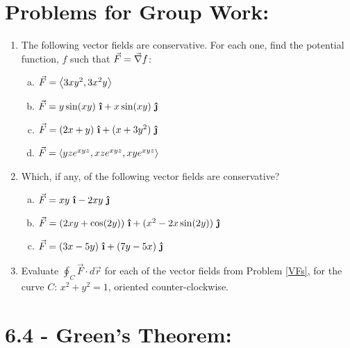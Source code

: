 

\section*{Problems for Group Work:}


\begin{enumerate}[{Problem} 1: ]
\item The following vector fields are conservative. For each one, find the potential function, \(f\) such that \(\vec{F} = \vec{\nabla} f\):
\begin{enumerate}[a)]
\item \(\vec{F} = \left\langle3xy^2, 3x^2y\right\rangle\)
\item \(\vec{F} = y\sin(xy)\ \ihat +x\sin(xy)\ \jhat\)
\item \(\vec{F} = (2x+y)\ \ihat +(x+3y^2)\ \jhat\)
\item \(\vec{F} = \left\langle yze^{xyz},xze^{xyz},xye^{xyz}\right\rangle\)

\end{enumerate}

\item Which, if any, of the following vector fields are conservative? \label{VFs}
\begin{enumerate}[a)]
\item \(\vec{F} = xy\ \ihat -2xy\ \jhat\)
\item \(\vec{F} = (2xy+\cos(2y))\ \ihat +(x^2-2x\sin(2y))\ \jhat\)
\item \(\vec{F} = (3x-5y)\ \ihat +(7y-5x)\ \jhat\)

\end{enumerate}

\item Evaluate \(\oint_C\vec{F}\cdot d\vec{r}\) for each of the vector fields from Problem \ref{VFs}, for the curve \(C\): \(x^2+y^2=1\), oriented counter-clockwise.

\end{enumerate}

\pagebreak

\section*{6.4 - Green's Theorem:}

\hspace*{-.8in}%

